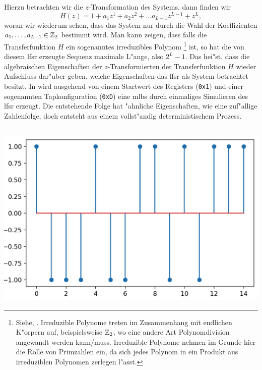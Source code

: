 Hierzu betrachten wir die $z$-Transformation des Systems, dann finden wir
\[
H(z) = 1 + a_1 z^{1} + a_2 z^2 + \ldots a_{L-1} z^{L-1} + z^L,
\]
woran wir wiederum sehen, dass das System nur durch die Wahl der Koeffizienten $a_1, \ldots, a_{L-1} \in \mathbb{Z}_2$ bestimmt wird.
Man kann zeigen, dass falls die Transferfunktion $H$ ein sogenanntes irreduzibles Polynom
\footnote{
    Siehe, . 
    Irreduzible Polynome treten im Zusammenhang mit endlichen K"orpern auf, beispielsweise $\mathbb{Z}_2$, wo eine andere Art Polynomdivision angewandt werden kann/muss. 
    Irreduzible Polynome nehmen im Grunde hier die Rolle von Primzahlen ein, da sich jedes Polynom in ein Produkt aus irreduziblen Polynomen zerlegen l"asst.
} ist, so hat die von diesem \gls{lfsr} erzeugte Sequenz maximale L"ange, also $2^L-1$.
Das hei"st, dass die algebraischen Eigenschaften der $z$-Transformierten der Transferfunktion $H$ wieder Aufschluss dar"uber geben, welche Eigenschaften das \gls{lfsr} als System betrachtet besitzt.
In  wird ausgehend von einem Startwert des Registers (\texttt{0x1}) und einer sogenannten Tapkonfiguration (\texttt{0xD}) eine \gls{mlbs} durch einmaliges Simulieren des \gls{lfsr} erzeugt.
Die entstehende Folge hat "ahnliche Eigenschaften, wie eine  zuf"allige Zahlenfolge, doch entsteht aus einem vollst"andig deterministischem Prozess.
%
\begin{listing}[ht]
    \noindent
    \begin{minipage}{0.51\textwidth}
        \strut\vspace*{-\baselineskip}\newline
        \inputminted[firstline=5, lastline=32]{python3}{code/mlbs.py}
    \end{minipage}%
    \begin{minipage}{0.48\textwidth}
        \strut\vspace*{-\baselineskip}\newline
        \includegraphics[width=\textwidth]{code/mlbs.png}
    \end{minipage}
    \label{py:mlbs}
\end{listing}
%
\FloatBarrier
%

